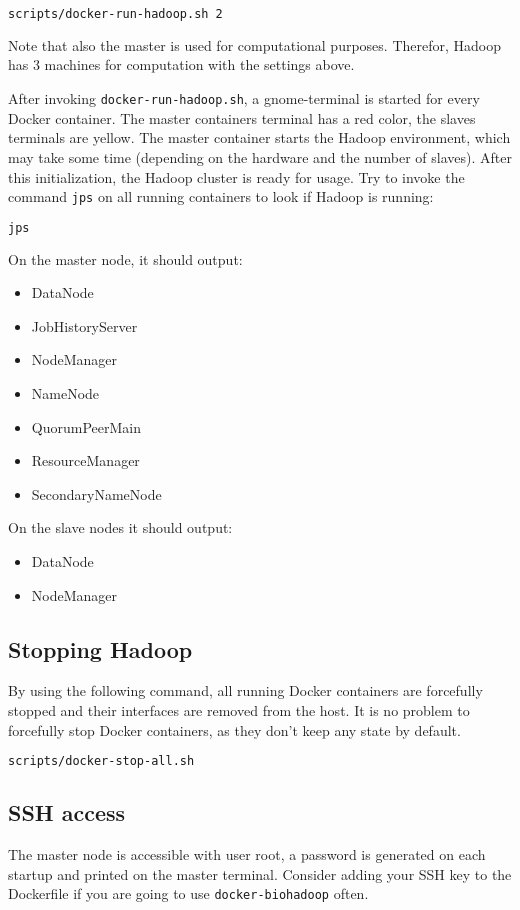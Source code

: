 \begin{lstlisting}[language=bash]
scripts/docker-run-hadoop.sh 2
\end{lstlisting}

Note that also the master is used for computational purposes. Therefor, Hadoop has 3 machines for computation with the settings above.

After invoking \texttt{docker-run-hadoop.sh}, a gnome-terminal is started for every Docker container. The master containers terminal has a red color, the slaves terminals are yellow. The master container starts the Hadoop environment, which may take some time (depending on the hardware and the number of slaves). After this initialization, the Hadoop cluster is ready for usage. Try to invoke the command \texttt{jps} on all running containers to look if Hadoop is running:

\begin{lstlisting}[language=bash]
jps
\end{lstlisting}

On the master node, it should output:
\begin{itemize}
  \item DataNode
  \item JobHistoryServer
  \item NodeManager
  \item NameNode
  \item QuorumPeerMain
  \item ResourceManager
  \item SecondaryNameNode
\end{itemize}

On the slave nodes it should output:
\begin{itemize}
  \item DataNode
  \item NodeManager
\end{itemize}

\subsection{Stopping Hadoop}
By using the following command, all running Docker containers are forcefully stopped and their interfaces are removed from the host. It is no problem to forcefully stop Docker containers, as they don't keep any state by default.
\begin{lstlisting}[language=bash]
scripts/docker-stop-all.sh
\end{lstlisting}

\subsection{SSH access}
The master node is accessible with user root, a password is generated on each startup and printed on the master terminal. Consider adding your SSH key to the Dockerfile if you are going to use \texttt{docker-biohadoop} often.